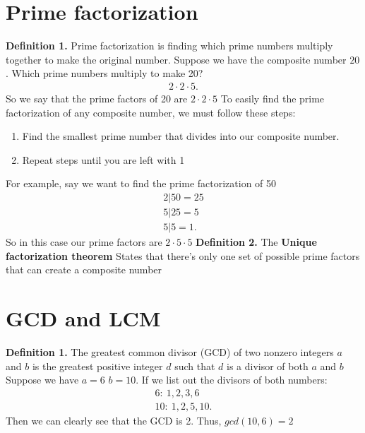 \documentclass{report}
\begin{document}
   \bigbreak \noindent \bigbreak \noindent 
   \section{\LARGE Prime factorization}
   \bigbreak \noindent 
   \textbf{Definition 1.} Prime factorization is finding which prime numbers multiply together to make the original number.
   \bigbreak \noindent 
   Suppose we have the composite number $20$. Which prime numbers multiply to make 20? 
   \begin{align*}
       2 \cdot  2 \cdot  5
   .\end{align*}
   So we say that the prime factors of 20 are $2 \cdot 2 \cdot 5 $
   \bigbreak \noindent 
   To easily find the prime factorization of any composite number, we must follow these steps:
   \begin{enumerate}
       \item Find the smallest prime number that divides into our composite number.
        \item Repeat steps until you are left with 1
   \end{enumerate}
   For example, say we want to find the prime factorization of 50
   \begin{align*}
       2 | 50 = 25 \\
       5 | 25 = 5 \\
       5 | 5  = 1
   .\end{align*}
   So in this case our prime factors are $2\cdot 5\cdot 5 $
   \bigbreak \noindent 
   \textbf{Definition 2.} The \textbf{Unique factorization theorem} States that there's only one set of possible prime factors that can create a composite number

   \pagebreak \bigbreak \noindent 
   \section{\LARGE GCD and LCM}
   \bigbreak \noindent 
   \textbf{Definition 1.} The greatest common divisor (GCD) of two nonzero integers $a $ and $b $ is the greatest positive integer $d $ such that $d $ is a divisor of both $a $ and $b $
   \bigbreak \noindent 
   Suppose we have $a=6$ $b=10$. If we list out the divisors of both numbers:
   \begin{align*}
       6:\ 1,2,3,6 \\
       10:\ 1,2,5,10
   .\end{align*}
   \bigbreak \noindent 
   Then we can clearly see that the GCD is 2. Thus, $gcd(10,6) = 2 $
\end{document}
